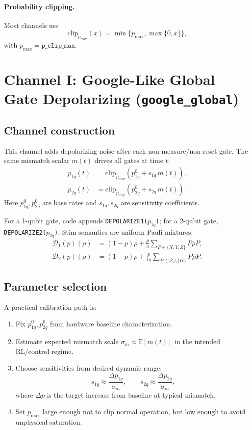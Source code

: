 \documentclass[11pt]{article}
\begin{document}
\paragraph{Probability clipping.}
Most channels use
\begin{equation}
\mathrm{clip}_{p_{\max}}(x)=\min\{p_{\max},\max\{0,x\}\},
\end{equation}
with $p_{\max}=\texttt{p\_clip\_max}$.

\section{Channel I: Google-Like Global Gate Depolarizing (\texttt{google\_global})}

\subsection{Channel construction}
This channel adds depolarizing noise after each non-measure/non-reset gate.
The same mismatch scalar $m(t)$ drives all gates at time $t$:
\begin{align}
p_{1q}(t) &= \mathrm{clip}_{p_{\max}}\!\left(p_{1q}^{0}+s_{1q}\,m(t)\right),\\
p_{2q}(t) &= \mathrm{clip}_{p_{\max}}\!\left(p_{2q}^{0}+s_{2q}\,m(t)\right).
\label{eq:global_google_probs}
\end{align}
Here $p_{1q}^{0},p_{2q}^{0}$ are base rates and $s_{1q},s_{2q}$ are
sensitivity coefficients.

For a 1-qubit gate, code appends \texttt{DEPOLARIZE1($p_{1q}$)};
for a 2-qubit gate, \texttt{DEPOLARIZE2($p_{2q}$)}.
Stim semantics are uniform Pauli mixtures:
\begin{align}
\mathcal{D}_{1}(p)(\rho)&=(1-p)\rho+\frac{p}{3}\sum_{P\in\{X,Y,Z\}}P\rho P,\\
\mathcal{D}_{2}(p)(\rho)&=(1-p)\rho+\frac{p}{15}\sum_{P\in\mathcal{P}_2\setminus\{II\}}P\rho P.
\end{align}

\subsection{Parameter selection}
A practical calibration path is:
\begin{enumerate}[label=\textbf{G\arabic*}.]
\item Fix $p_{1q}^{0},p_{2q}^{0}$ from hardware baseline characterization.
\item Estimate expected mismatch scale
$\sigma_m\approx \mathbb{E}[m(t)]$ in the intended RL/control regime.
\item Choose sensitivities from desired dynamic range:
\begin{equation}
s_{1q}\approx \frac{\Delta p_{1q}}{\sigma_m},
\qquad
s_{2q}\approx \frac{\Delta p_{2q}}{\sigma_m},
\end{equation}
where $\Delta p$ is the target increase from baseline at typical mismatch.
\item Set $p_{\max}$ large enough not to clip normal operation,
but low enough to avoid unphysical saturation.
\end{enumerate}
\end{document}
